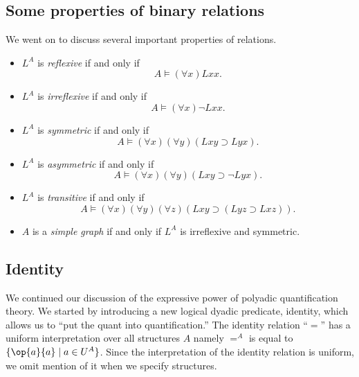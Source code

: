 \subsection{Some properties of binary relations}
We went on to discuss several important properties of relations.
\begin{itemize}
\item
$L^A$ is \emph{reflexive} if and only if
\[A\models (\forall x)Lxx.\]
\item
$L^A$ is \emph{irreflexive} if and only if
\[A\models (\forall x)\neg Lxx.\]
\item
$L^A$ is \emph{symmetric} if and only if
\[A\models (\forall x)(\forall y)(Lxy\supset Lyx).\]
\item
$L^A$ is \emph{asymmetric} if and only if
\[A\models (\forall x)(\forall y)(Lxy\supset \neg Lyx).\]
\item
$L^A$ is \emph{transitive} if and only if
\[A\models (\forall x)(\forall y)(\forall z)(Lxy\supset (Lyz\supset Lxz)).\]
\item
$A$ is a \emph{simple graph} if and only if $L^A$ is irreflexive and symmetric.
\end{itemize}
\subsection{Identity}

We continued our discussion of the expressive power of polyadic quantification theory. We started by introducing a new logical dyadic predicate, identity, which  allows us to ``put the quant into quantification.'' The identity relation ``$=$'' has a uniform interpretation over all structures $A$ namely $=^A$ is equal to $\{\op{a}{a}\mid a\in U^A\}$. Since the interpretation of the identity relation is uniform, we omit mention of it when we specify structures. 
